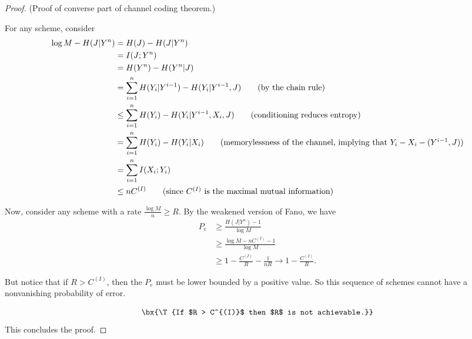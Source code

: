 \begin{proof} (Proof of converse part of channel coding theorem.)

  For any scheme, consider
  \begin{align*}
    \log M - H(J | Y^n) &= H(J) - H(J | Y^n) \\
    &= I(J; Y^n) \\
    &= H(Y^n) - H(Y^n | J) \\
    &= \sum_{i=1}^{n} H(Y_i | Y^{i-1}) - H(Y_i | Y^{i-1}, J) \tag{by the chain rule}  \\
    & \leq \sum_{i=1}^{n} H(Y_i) - H(Y_i | Y^{i-1}, X_i, J) \tag{conditioning reduces entropy} \\
    &= \sum_{i=1}^{n} H(Y_i) - H(Y_i | X_i) \tag{memorylessness of the channel, implying that $Y_i - X_i - (Y^{i-1}, J)$}\\
    &= \sum_{i=1}^{n} I(X_i; Y_i) \\
    & \leq n C^{(I)} \tag{since $C^{(I)}$ is the maximal mutual information}
  \end{align*}

  Now, consider any scheme with a rate $\frac{\log M}{n}  \geq R$.  By the weakened version of Fano, we have
  \begin{align*}
    P_e &\geq \frac{H(J | Y^n) - 1}{\log M} \\
    & \geq \frac{\log M - n C^{(I)} - 1}{\log M} \\
    & \geq 1 - \frac{C^{(I)}}{R} - \frac{1}{nR} \to 1 - \frac{C^{(I)}}{R} \tag{as $n \to \infty$}.
  \end{align*}

  But notice that if $R > C^{(I)}$, then the $P_e$ must be lower bounded by a positive value.  So this sequence of schemes cannot have a nonvanishing probability of error.

  \[
    \bx{\T{If $R > C^{(I)}$ then $R$ is not achievable.}}
  \]
  This concludes the proof.
\end{proof}

